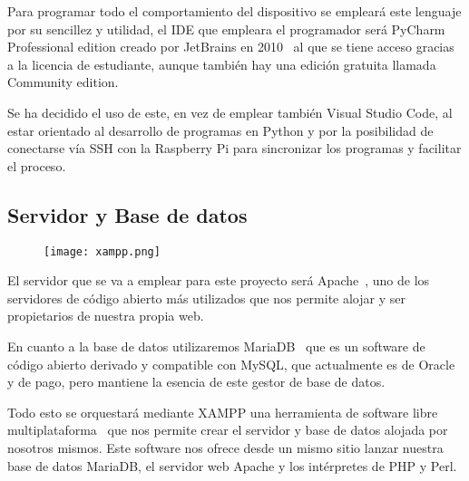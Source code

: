 Para programar todo el comportamiento del dispositivo se empleará este lenguaje por su sencillez y utilidad, el IDE que empleara el programador será PyCharm Professional edition creado por JetBrains en 2010~\cite{noauthor_pycharm_2021} al que se tiene acceso gracias a la licencia de estudiante, aunque también hay una edición gratuita llamada Community edition.

Se ha decidido el uso de este, en vez de emplear también Visual Studio Code, al estar orientado al desarrollo de programas en Python y por la posibilidad de conectarse vía SSH con la Raspberry Pi para sincronizar los programas y facilitar el proceso.

\subsection{Servidor y Base de datos}\label{subsec:servidorDB}
\begin{figure}[H]
	{\texttt{[image: xampp.png]}}\label{fig:logoXAMPP}
\end{figure}
El servidor que se va a emplear para este proyecto será Apache~\cite{noauthor_apache_nodate}, uno de los servidores de código abierto más utilizados que nos permite alojar y ser propietarios de nuestra propia web.

En cuanto a la base de datos utilizaremos MariaDB~\cite{noauthor_mariadb_nodate} que es un software de código abierto derivado y compatible con MySQL, que actualmente es de Oracle y de pago, pero mantiene la esencia de este gestor de base de datos.

Todo esto se orquestará mediante XAMPP una herramienta de software libre multiplataforma~\cite{noauthor_xampp_nodate} que nos permite crear el servidor y base de datos alojada por nosotros mismos. Este software nos ofrece desde un mismo sitio lanzar nuestra base de datos MariaDB, el servidor web Apache y los intérpretes de PHP y Perl.